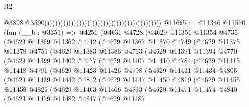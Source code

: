 \begin{lexlean}{R2}
\begin{coremodule}
                                                                                            @3898
                                                                                            @3590))))))))))))))))))))))))))))))))))))))))))))
@11665 := @11346
    @11570
    (fun (__b : @3351) =>
    @4251
      (@4631
        @4728
        (@4629
          @11351
          @11354
          @4735
          (@4629
            @11359
            @11362
            @4742
            (@4629
              @11367
              @11370
              @4749
              (@4629
                @11375
                @11378
                @4756
                (@4629
                  @11383
                  @11386
                  @4763
                  (@4629
                    @11391
                    @11394
                    @4770
                    (@4629
                      @11399
                      @11402
                      @4777
                      (@4629
                        @11407
                        @11410
                        @4784
                        (@4629
                          @11415
                          @11418
                          @4791
                          (@4629
                            @11423
                            @11426
                            @4798
                            (@4629
                              @11431
                              @11434
                              @4805
                              (@4629
                                @11439
                                @11442
                                @4812
                                (@4629
                                  @11447
                                  @11450
                                  @4819
                                  (@4629
                                    @11455
                                    @11458
                                    @4826
                                    (@4629
                                      @11463
                                      @11466
                                      @4833
                                      (@4629
                                        @11471
                                        @11474
                                        @4840
                                        (@4629
                                          @11479
                                          @11482
                                          @4847
                                          (@4629
                                            @11487

\end{coremodule}
\end{lexlean}
